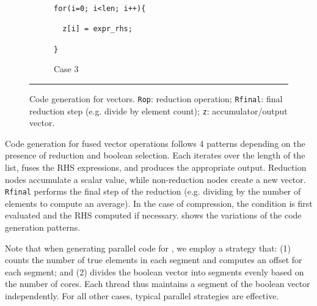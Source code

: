 \begin{figure}[htbp]
\begin{subfigure}[t]{.45\columnwidth}
\begin{small}
\begin{verbatim}
for(i=0; i<len; i++){

  z[i] = expr_rhs;

}
\end{verbatim}
\end{small}
\caption{Case 3} \label{fig:codegen_c3}
\end{subfigure}
\par\noindent\rule{\columnwidth}{0.6pt}
\caption{Code generation for vectors. \texttt{Rop}: reduction operation; \texttt{Rfinal}: final reduction step (e.g. divide by element count); \texttt{z}: accumulator/output vector.} \label{fig:codegen_vectors}
\end{figure}

Code generation for fused vector operations follows 4 patterns depending on the presence
of reduction and boolean selection. Each iterates over the length of the list, fuses the
RHS expressions, and produces the appropriate output. Reduction nodes accumulate a scalar
value, while non-reduction nodes create a new vector. \texttt{Rfinal} performs the final
step of the reduction (e.g. dividing by the number of elements to compute an average).
In the case of compression, the condition is first evaluated and the RHS computed if
necessary.  shows the variations of the code generation patterns.

Note that when generating parallel code for , we employ a
strategy that:
(1) counts the number of true elements in each segment and computes an offset for
each segment; and
(2) divides the boolean vector into segments evenly based on the number of cores.
Each thread thus maintains a segment of the boolean vector independently. For all other
cases, typical parallel strategies are effective.



